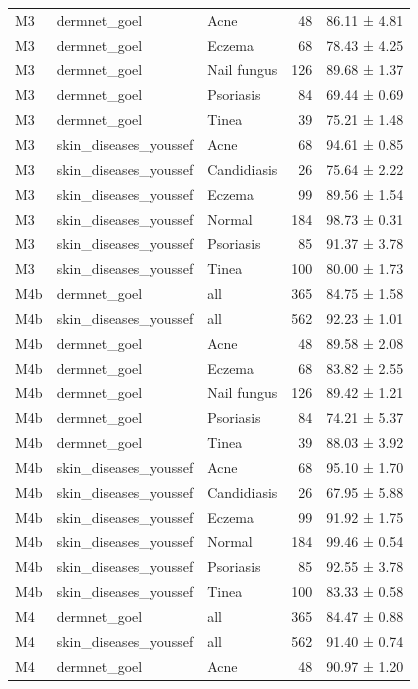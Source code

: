 \begin{tabular}{lllrl}
M3 & dermnet\_goel & Acne & 48 & 86.11 ± 4.81 \\
M3 & dermnet\_goel & Eczema & 68 & 78.43 ± 4.25 \\
M3 & dermnet\_goel & Nail fungus & 126 & 89.68 ± 1.37 \\
M3 & dermnet\_goel & Psoriasis & 84 & 69.44 ± 0.69 \\
M3 & dermnet\_goel & Tinea & 39 & 75.21 ± 1.48 \\
M3 & skin\_diseases\_youssef & Acne & 68 & 94.61 ± 0.85 \\
M3 & skin\_diseases\_youssef & Candidiasis & 26 & 75.64 ± 2.22 \\
M3 & skin\_diseases\_youssef & Eczema & 99 & 89.56 ± 1.54 \\
M3 & skin\_diseases\_youssef & Normal & 184 & 98.73 ± 0.31 \\
M3 & skin\_diseases\_youssef & Psoriasis & 85 & 91.37 ± 3.78 \\
M3 & skin\_diseases\_youssef & Tinea & 100 & 80.00 ± 1.73 \\
M4b & dermnet\_goel & all & 365 & 84.75 ± 1.58 \\
M4b & skin\_diseases\_youssef & all & 562 & 92.23 ± 1.01 \\
M4b & dermnet\_goel & Acne & 48 & 89.58 ± 2.08 \\
M4b & dermnet\_goel & Eczema & 68 & 83.82 ± 2.55 \\
M4b & dermnet\_goel & Nail fungus & 126 & 89.42 ± 1.21 \\
M4b & dermnet\_goel & Psoriasis & 84 & 74.21 ± 5.37 \\
M4b & dermnet\_goel & Tinea & 39 & 88.03 ± 3.92 \\
M4b & skin\_diseases\_youssef & Acne & 68 & 95.10 ± 1.70 \\
M4b & skin\_diseases\_youssef & Candidiasis & 26 & 67.95 ± 5.88 \\
M4b & skin\_diseases\_youssef & Eczema & 99 & 91.92 ± 1.75 \\
M4b & skin\_diseases\_youssef & Normal & 184 & 99.46 ± 0.54 \\
M4b & skin\_diseases\_youssef & Psoriasis & 85 & 92.55 ± 3.78 \\
M4b & skin\_diseases\_youssef & Tinea & 100 & 83.33 ± 0.58 \\
M4 & dermnet\_goel & all & 365 & 84.47 ± 0.88 \\
M4 & skin\_diseases\_youssef & all & 562 & 91.40 ± 0.74 \\
M4 & dermnet\_goel & Acne & 48 & 90.97 ± 1.20 \\

\end{tabular}
